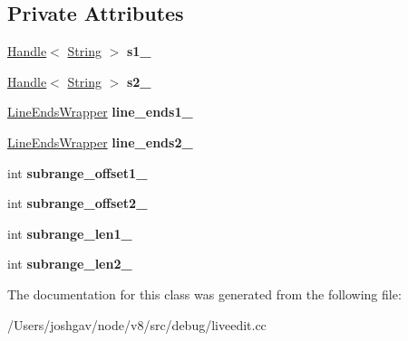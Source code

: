 \subsection*{Private Attributes}
\begin{DoxyCompactItemize}
\item 
\hyperlink{classv8_1_1internal_1_1_handle}{Handle}$<$ \hyperlink{classv8_1_1internal_1_1_string}{String} $>$ {\bfseries s1\+\_\+}\hypertarget{classv8_1_1internal_1_1_line_array_compare_input_a3eff5dcbfd0281d95f27d7e7555597a4}{}\label{classv8_1_1internal_1_1_line_array_compare_input_a3eff5dcbfd0281d95f27d7e7555597a4}

\item 
\hyperlink{classv8_1_1internal_1_1_handle}{Handle}$<$ \hyperlink{classv8_1_1internal_1_1_string}{String} $>$ {\bfseries s2\+\_\+}\hypertarget{classv8_1_1internal_1_1_line_array_compare_input_acc2f0054e6557a6278b79bbb561e4228}{}\label{classv8_1_1internal_1_1_line_array_compare_input_acc2f0054e6557a6278b79bbb561e4228}

\item 
\hyperlink{classv8_1_1internal_1_1_line_ends_wrapper}{Line\+Ends\+Wrapper} {\bfseries line\+\_\+ends1\+\_\+}\hypertarget{classv8_1_1internal_1_1_line_array_compare_input_ae426446bcaa80288d2d53ba8f5fc19a9}{}\label{classv8_1_1internal_1_1_line_array_compare_input_ae426446bcaa80288d2d53ba8f5fc19a9}

\item 
\hyperlink{classv8_1_1internal_1_1_line_ends_wrapper}{Line\+Ends\+Wrapper} {\bfseries line\+\_\+ends2\+\_\+}\hypertarget{classv8_1_1internal_1_1_line_array_compare_input_a2f5c31a68852911ba7e6cc2570a8d6a1}{}\label{classv8_1_1internal_1_1_line_array_compare_input_a2f5c31a68852911ba7e6cc2570a8d6a1}

\item 
int {\bfseries subrange\+\_\+offset1\+\_\+}\hypertarget{classv8_1_1internal_1_1_line_array_compare_input_ae2e5337f4503cb426eb9d101df144aac}{}\label{classv8_1_1internal_1_1_line_array_compare_input_ae2e5337f4503cb426eb9d101df144aac}

\item 
int {\bfseries subrange\+\_\+offset2\+\_\+}\hypertarget{classv8_1_1internal_1_1_line_array_compare_input_a2f8204479ce309aac4a4342a5de2f170}{}\label{classv8_1_1internal_1_1_line_array_compare_input_a2f8204479ce309aac4a4342a5de2f170}

\item 
int {\bfseries subrange\+\_\+len1\+\_\+}\hypertarget{classv8_1_1internal_1_1_line_array_compare_input_a60833746a3405a4fc903b4a1118183fa}{}\label{classv8_1_1internal_1_1_line_array_compare_input_a60833746a3405a4fc903b4a1118183fa}

\item 
int {\bfseries subrange\+\_\+len2\+\_\+}\hypertarget{classv8_1_1internal_1_1_line_array_compare_input_a32c11e79b6b7f0bc3bfa4330594dd846}{}\label{classv8_1_1internal_1_1_line_array_compare_input_a32c11e79b6b7f0bc3bfa4330594dd846}

\end{DoxyCompactItemize}


The documentation for this class was generated from the following file\+:\begin{DoxyCompactItemize}
\item 
/\+Users/joshgav/node/v8/src/debug/liveedit.\+cc\end{DoxyCompactItemize}
